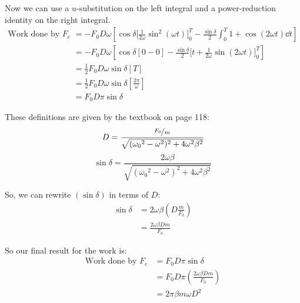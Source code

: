 \documentclass{article}
\begin{document}
Now we can use a $u$-substitution on the left integral and a power-reduction identity on the right integral.
\begin{equation*}
\begin{aligned}
\text{Work done by } F_e &= -F_0D\omega\left[\cos\delta\Bigg[\frac{1}{2\omega}\sin^2(\omega t)\Bigg]_0^T - \frac{\sin\delta}{2}\int_0^T 1 + \cos(2\omega t) \dd t\right] \\
&= -F_0D\omega\left[\cos\delta[0 - 0] - \frac{\sin\delta}{2}\Bigg[t + \frac{1}{2\omega}\sin(2\omega t)\Bigg]_0^T\right] \\
&= \frac{1}{2}F_0D\omega\sin\delta[T] \\
&= \frac{1}{2}F_0D\omega\sin\delta\left[\frac{2\pi}{\omega}\right] \\
&= F_0D\pi\sin\delta
\end{aligned}
\end{equation*}

These definitions are given by the textbook on page 118:
\begin{equation}
D = \frac{\nicefrac{F_0}{m}}{\sqrt{({\omega_0}^2-\omega^2)^2 + 4\omega^2\beta^2}}
\end{equation}
\begin{equation}
\sin\delta = \frac{2\omega\beta}{\sqrt{({\omega_0}^2-\omega^2)^2 + 4\omega^2\beta^2}}
\end{equation}

So, we can rewrite $(\sin\delta)$ in terms of $D$:
\begin{equation*}
\begin{aligned}
\sin\delta &= 2\omega\beta\left(D\frac{m}{F_0}\right) \\
&= \frac{2\omega\beta Dm}{F_0}
\end{aligned}
\end{equation*}

So our final result for the work is:
\begin{equation*}
\begin{aligned}
\text{Work done by } F_e &= F_0D\pi\sin\delta \\
&= F_0D\pi\left(\frac{2\omega\beta Dm}{F_0}\right) \\
&= 2\pi\beta m\omega D^2
\end{aligned}
\end{equation*}
\end{document}
